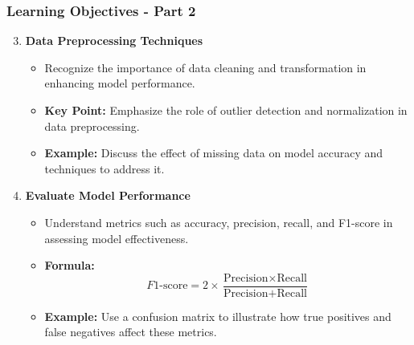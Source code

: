 \documentclass[aspectratio=169]{beamer}
\begin{document}
\begin{frame}[fragile]
    \frametitle{Learning Objectives - Part 2}
    \begin{enumerate}
        \setcounter{enumi}{2} %
        \item \textbf{Data Preprocessing Techniques}
        \begin{itemize}
            \item Recognize the importance of data cleaning and transformation in enhancing model performance.
            \item \textbf{Key Point:} Emphasize the role of outlier detection and normalization in data preprocessing.
            \item \textbf{Example:} Discuss the effect of missing data on model accuracy and techniques to address it.
        \end{itemize}
        
        \item \textbf{Evaluate Model Performance}
        \begin{itemize}
            \item Understand metrics such as accuracy, precision, recall, and F1-score in assessing model effectiveness.
            \item \textbf{Formula:}
            \begin{equation}
                F1\text{-score} = 2 \times \frac{\text{Precision} \times \text{Recall}}{\text{Precision} + \text{Recall}}
            \end{equation}
            \item \textbf{Example:} Use a confusion matrix to illustrate how true positives and false negatives affect these metrics.
        \end{itemize}
    \end{enumerate}
\end{frame}
\end{document}
